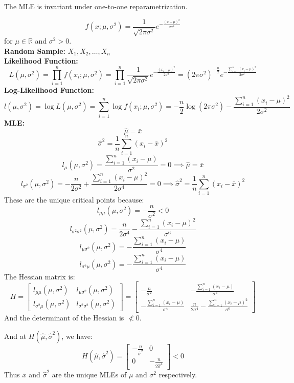 \documentclass[answers,12pt,addpoints]{exam}
\begin{document}
\begin{remark}
     The MLE is invariant under one-to-one reparametrization. 
\end{remark}
\begin{definition}
    $$f(x;\mu,\sigma^2) = \frac{1}{\sqrt{2\pi\sigma^2}} e^{-\frac{(x-\mu)^2}{2\sigma^2}}$$
    for $\mu \in \mathbb{R}$ and $\sigma^2 > 0$.\\
    \textbf{Random Sample:} $X_1, X_2, \ldots, X_n$ \\
    \textbf{Likelihood Function:}
    $$L(\mu,\sigma^2) = \prod_{i=1}^{n} f(x_i;\mu,\sigma^2) = \prod_{i=1}^{n} \frac{1}{\sqrt{2\pi\sigma^2}} e^{-\frac{(x_i-\mu)^2}{2\sigma^2}} = (2\pi\sigma^2)^{-\frac{n}{2}} e^{-\frac{\sum_{i=1}^{n} (x_i-\mu)^2}{2\sigma^2}}$$
    \textbf{Log-Likelihood Function:}
    $$l(\mu,\sigma^2) = \log L(\mu,\sigma^2) = \sum_{i=1}^{n} \log f(x_i;\mu,\sigma^2) = -\frac{n}{2} \log (2\pi\sigma^2) - \frac{\sum_{i=1}^{n} (x_i-\mu)^2}{2\sigma^2}$$
    \textbf{MLE:}
    $$\hat{\mu} = \bar{x}$$
    $$\hat{\sigma}^2 = \frac{1}{n} \sum_{i=1}^{n} (x_i - \bar{x})^2$$
    $$l_\mu(\mu,\sigma^2) = \frac{\sum_{i=1}^{n} (x_i-\mu)}{\sigma^2} = 0 \implies \hat{\mu} = \bar{x}$$
    $$l_{\sigma^2}(\mu,\sigma^2) = -\frac{n}{2\sigma^2} + \frac{\sum_{i=1}^{n} (x_i-\mu)^2}{2\sigma^4} = 0 \implies \hat{\sigma}^2 = \frac{1}{n} \sum_{i=1}^{n} (x_i - \bar{x})^2$$
    These are the unique critical points because:
    $$l_{\mu\mu}(\mu,\sigma^2) = -\frac{n}{\sigma^2} < 0$$
    $$l_{\sigma^2\sigma^2}(\mu,\sigma^2) = \frac{n}{2\sigma^4} - \frac{\sum_{i=1}^{n} (x_i-\mu)^2}{\sigma^6}$$
    $$l_{\mu\sigma^2}(\mu,\sigma^2) = -\frac{\sum_{i=1}^{n} (x_i-\mu)}{\sigma^4}$$
    $$l_{\sigma^2\mu}(\mu,\sigma^2) = -\frac{\sum_{i=1}^{n} (x_i-\mu)}{\sigma^4}$$
    The Hessian matrix is:
    $$H = \begin{bmatrix}
        l_{\mu\mu}(\mu,\sigma^2) & l_{\mu\sigma^2}(\mu,\sigma^2)\\
        l_{\sigma^2\mu}(\mu,\sigma^2) & l_{\sigma^2\sigma^2}(\mu,\sigma^2)
    \end{bmatrix} = \begin{bmatrix}
        -\frac{n}{\sigma^2} & -\frac{\sum_{i=1}^{n} (x_i-\mu)}{\sigma^4}\\
        -\frac{\sum_{i=1}^{n} (x_i-\mu)}
{\sigma^4} & \frac{n}{2\sigma^4} - \frac{\sum_{i=1}^{n} (x_i-\mu)^2}{\sigma^6}
    \end{bmatrix}$$
    And the determinant of the Hessian is $\not < 0$.

    And at $H(\hat{\mu},\hat{\sigma}^2)$, we have:
    $$H(\hat{\mu},\hat{\sigma}^2) = \begin{bmatrix}
        -\frac{n}{\hat{\sigma}^2} & 0\\
        0 & -\frac{n}{2\hat{\sigma}^4}
    \end{bmatrix} < 0$$
    Thus $\bar{x}$ and $\hat{\sigma}^2$ are the unique MLEs of $\mu$ and $\sigma^2$ respectively.
\end{definition}
\end{document}
